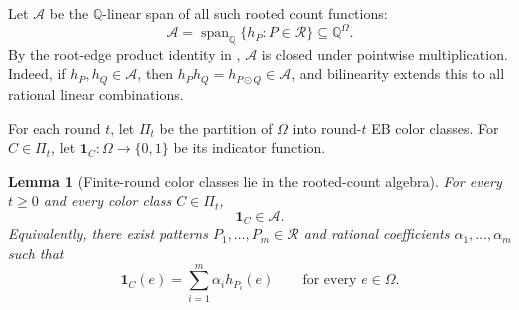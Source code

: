 \documentclass[11pt]{article}
\newtheorem{lemma}[theorem]{Lemma}
\newcommand{\Q}{\mathbb{Q}}
\newcommand{\cR}{\mathcal{R}}
\newcommand{\cA}{\mathcal{A}}
\begin{document}
Let $\cA$ be the $\Q$-linear span of all such rooted count functions:
\[
\cA=\operatorname{span}_{\Q}\{h_P:P\in\cR\}\subseteq \Q^\Omega.
\]
By the root-edge product identity in , $\cA$ is closed under pointwise multiplication.  Indeed, if $h_P,h_Q\in\cA$, then $h_Ph_Q=h_{P\odot Q}\in\cA$, and bilinearity extends this to all rational linear combinations.

For each round $t$, let $\Pi_t$ be the partition of $\Omega$ into round-$t$ EB color classes.  For $C\in\Pi_t$, let $\mathbf{1}_C:\Omega\to\{0,1\}$ be its indicator function.

\begin{lemma}[Finite-round color classes lie in the rooted-count algebra]
\label{lem:indicator-span}
For every $t\geq 0$ and every color class $C\in\Pi_t$,
\[
\mathbf{1}_C\in\cA.
\]
Equivalently, there exist patterns $P_1,\ldots,P_m\in\cR$ and rational coefficients $\alpha_1,\ldots,\alpha_m$ such that
\[
\mathbf{1}_C(e)=\sum_{i=1}^m\alpha_i h_{P_i}(e)
\qquad\text{for every }e\in\Omega.
\]
\end{lemma}
\end{document}
